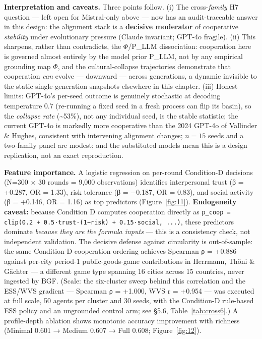 \textbf{Interpretation and caveats.} Three points follow. (i) The cross-\textit{family} H7 question — left open for Mistral-only above — now has an audit-traceable answer in this design: the alignment stack is a \textbf{decisive moderator} of cooperative \textit{stability} under evolutionary pressure (Claude invariant; GPT-4o fragile). (ii) This sharpens, rather than contradicts, the $\Phi$/P\_LLM dissociation: cooperation here is governed almost entirely by the model prior P\_LLM, not by any empirical grounding map $\Phi$, and the cultural-collapse trajectories demonstrate that cooperation \textit{can} evolve — downward — across generations, a dynamic invisible to the static single-generation snapshots elsewhere in this chapter. (iii) Honest limits: GPT-4o's per-seed outcome is genuinely stochastic at decoding temperature 0.7 (re-running a fixed seed in a fresh process can flip its basin), so the \textit{collapse rate} (\textasciitilde{}53\%), not any individual seed, is the stable statistic; the current GPT-4o is markedly more cooperative than the 2024 GPT-4o of Vallinder \& Hughes, consistent with intervening alignment changes; $n = 15$ seeds and a two-family panel are modest; and the substituted models mean this is a design replication, not an exact reproduction.


\textbf{Feature importance.} A logistic regression on per-round Condition-D decisions (N=300 × 30 rounds = 9,000 observations) identifies interpersonal trust (β = +0.287, OR = 1.33), risk tolerance (β = −0.187, OR = 0.83), and social activity (β = +0.146, OR = 1.16) as top predictors (Figure~\ref{fig:11}). \textbf{Endogeneity caveat:} because Condition D computes cooperation directly as \texttt{p\_coop = clip(0.2 + 0.5·trust·(1−risk) + 0.15·social, ...)}, these predictors dominate \textit{because they are the formula inputs} — this is a consistency check, not independent validation. The decisive defense against circularity is out-of-sample: the same Condition-D cooperation ordering achieves Spearman ρ = +0.886 against per-city period-1 public-goods-game contributions in Herrmann, Thöni \& Gächter \cite{Herrmann2008} — a different game type spanning 16 cities across 15 countries, never ingested by BGF. (Scale: the six-cluster sweep behind this correlation and the ESS/WVS gradient — Spearman ρ = +1.000, WVS r = +0.954 — was executed at full scale, 50 agents per cluster and 30 seeds, with the Condition-D rule-based ESS policy and an ungrounded control arm; see §5.6, Table~\ref{tab:cross6}.) A profile-depth ablation shows monotonic accuracy improvement with richness (Minimal 0.601 → Medium 0.607 → Full 0.608; Figure~\ref{fig:12}).

